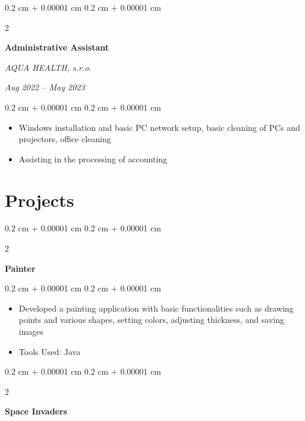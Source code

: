 \documentclass[10pt, letterpaper]{article}
\newenvironment{highlights}{
    \begin{itemize}[
        topsep=0.10 cm,
        parsep=0.10 cm,
        partopsep=0pt,
        itemsep=0pt,
        leftmargin=0.4 cm + 10pt
    ]
}{
    \end{itemize}
} %
\newenvironment{onecolentry}{
    \begin{adjustwidth}{
        0.2 cm + 0.00001 cm
    }{
        0.2 cm + 0.00001 cm
    }
}{
    \end{adjustwidth}
} %
\newenvironment{twocolentry}[2][]{
    \onecolentry
    \def\secondColumn{#2}
    \setcolumnwidth{\fill, 4.5 cm}
    \begin{paracol}{2}
}{
    \switchcolumn \raggedleft \secondColumn
    \end{paracol}
    \endonecolentry
} %
\let\hrefWithoutArrow\href
\renewcommand{\href}[2]{\hrefWithoutArrow{#1}{\ifthenelse{\equal{#2}{}}{ }{#2 }\raisebox{.15ex}{\footnotesize \faExternalLink*}}}
\begin{document}
        \vspace{0.2 cm}

        \begin{twocolentry}{
            
        \textit{Aug 2022 – May 2023}}
            \textbf{Administrative Assistant}
            
            \textit{AQUA HEALTH, s.r.o.}
        \end{twocolentry}

        \vspace{0.10 cm}
        \begin{onecolentry}
            \begin{highlights}
                \item Windows installation and basic PC network setup, basic cleaning of PCs and projectors, office cleaning
                \item Assisting in the processing of accounting
            \end{highlights}
        \end{onecolentry}

    \section{Projects}



        
        \begin{twocolentry}{
            
            
        \textit{\href{https://github.com/sabinasagova/painter}{\footnotesize\faGithub}}}
            \textbf{Painter}
        \end{twocolentry}

        \vspace{0.10 cm}
        \begin{onecolentry}
            \begin{highlights}
                \item Developed a painting application with basic functionalities such as drawing points and various shapes, setting colors, adjusting thickness, and saving images
                \item Tools Used: Java
            \end{highlights}
        \end{onecolentry}


        \vspace{0.2 cm}

        \begin{twocolentry}{
            
            
        \textit{\href{https://github.com/sabinasagova/spaceInvaders}{\footnotesize\faGithub}}}
            \textbf{Space Invaders}
        \end{twocolentry}
        \vspace{0.10 cm}
\end{document}
